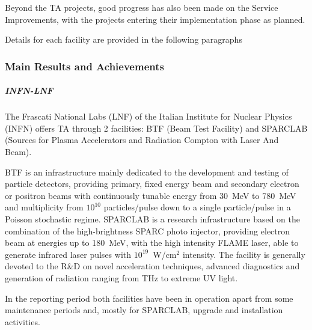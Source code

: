 Beyond the TA projects, good progress has also been made on the Service Improvements, with the projects entering their implementation phase as planned.

Details for each facility are provided in the following paragraphs

\subsubsection*{Main Results and Achievements}


\subparagraph{INFN-LNF}

The Frascati National Labs (LNF) of the Italian Institute for Nuclear Physics (INFN) offers TA through 2 facilities: BTF (Beam Test Facility) and SPARCLAB (Sources for Plasma Accelerators and Radiation Compton with Laser And Beam).

BTF is an infrastructure mainly dedicated to the development and testing of particle detectors, providing primary, fixed energy beam and secondary electron or positron beams with continuously tunable energy from \SI{30}{\MeV} to \SI{780}{\MeV} and multiplicity from $10^{10}$ particles/pulse down to a single particle/pulse in a Poisson stochastic regime.
SPARCLAB is a research infrastructure based on the combination of the high-brightness SPARC photo injector, providing electron beam at energies up to \SI{180}{\MeV}, with the high intensity FLAME laser, able to generate infrared laser pulses with $10^{19}$~W/cm$^2$ intensity. The facility is generally devoted to the R\&D on novel acceleration techniques, advanced diagnostics and generation of radiation ranging from THz to extreme UV light. 

In the reporting period both facilities have been in operation apart from some maintenance periods and, mostly for SPARCLAB, upgrade and installation activities.

